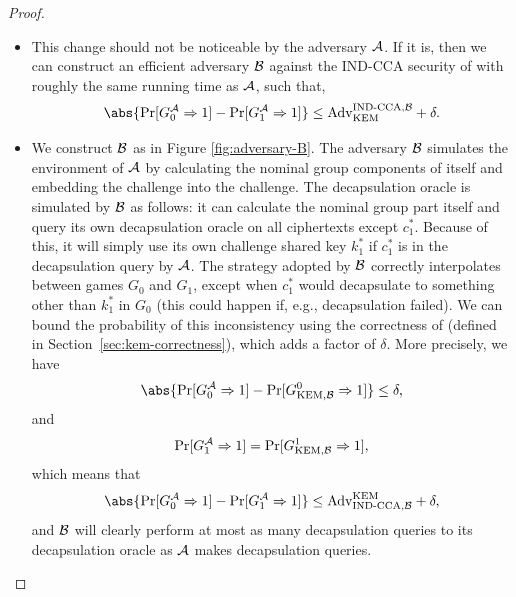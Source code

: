 \begin{proof}
\begin{itemize}
    \item[\emph{Claim 1}]
        This change should not be noticeable by the adversary $\mathcal{A}$.
        If it is, then we can construct an efficient adversary
        $\mathcal{B}$ against the IND-CCA security of \kem with roughly the
        same running time as $\mathcal{A}$, such that,
        \[
            \abs{\prone{G^{\adversary{A}}_0} - \prone{G^{\adversary{A}}_1}} \leq \advantage{\kem}{\cca, \adversary{B}} + \delta.
        \]

    \item[\emph{Proof}]
        We construct $\mathcal{B}$ as in Figure \ref{fig:adversary-B}.
        The adversary $\mathcal{B}$ simulates the environment of
        $\mathcal{A}$ by calculating the nominal group components of \ug
        itself and embedding the \kem challenge into the \ug challenge.
        The decapsulation oracle is simulated by $\mathcal{B}$ as follows:
        it can calculate the nominal group part itself and query its own \kem
        decapsulation oracle on all ciphertexts except $c_1^*$.
        Because of this, it will simply use its own challenge shared key
        $k^*_1$ if $c^*_1$ is in the decapsulation query by $\mathcal{A}$.
        The strategy adopted by $\mathcal{B}$ correctly interpolates
        between games $G_0$ and $G_1$, except when $c^*_1$ would decapsulate
        to something other than $k_1^*$ in $G_0$ (this could happen if, e.g., decapsulation failed).
        We can bound the probability of this inconsistency using the
        correctness of \kem (defined in Section~\ref{sec:kem-correctness}), which adds a factor of $\delta$.
        More precisely, we have
        \[
            \abs{\prone{G^{\adversary{A}}_0} - \prone{\G{\kem, \adversary{B}}{0}}} \le \delta,
        \]
        and
        \[
            \Pr[G^{\mathcal{A}}_1 \Rightarrow 1] = \Pr[G_{\text{KEM}, \mathcal{B}}^{1} \Rightarrow 1],
        \]
        which means that
        \[
            \abs{\prone{G^{\adversary{A}}_0} - \prone{G^{\adversary{A}}_1}} \leq \advantage{\cca, \adversary{B}}{\kem} + \delta,
        \]
        and $\mathcal{B}$ will clearly perform at most as many
        decapsulation queries to its \kem decapsulation oracle as
        $\mathcal{A}$ makes decapsulation queries.


\end{itemize}
\end{proof}
